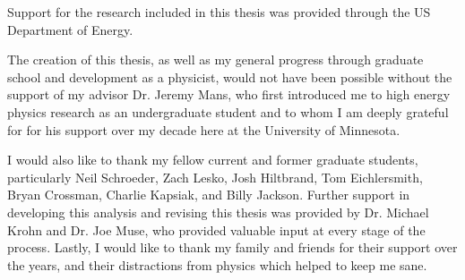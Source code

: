 
Support for the research included in this thesis was provided through the US Department of Energy. 

The creation of this thesis, as well as my general progress through graduate school and development as a physicist, would not have been possible without the support of my advisor Dr. Jeremy Mans, who first introduced me to high energy physics research as an undergraduate student and to whom I am deeply grateful for for his support over my decade here at the University of Minnesota.

I would also like to thank my fellow current and former graduate students, particularly Neil Schroeder, Zach Lesko, Josh Hiltbrand, Tom Eichlersmith, Bryan Crossman, Charlie Kapsiak, and Billy Jackson.
Further support in developing this analysis and revising this thesis was provided by Dr. Michael Krohn and Dr. Joe Muse, who provided valuable input at every stage of the process. 
Lastly, I would like to thank my family and friends for their support over the years, and their distractions from physics which helped to keep me sane. 

